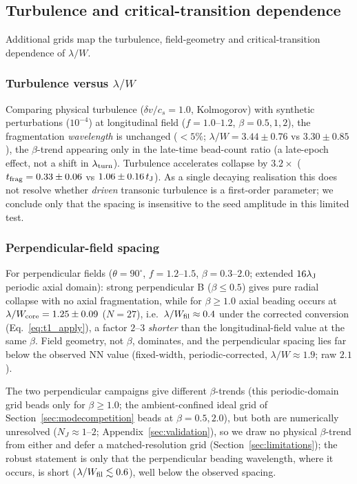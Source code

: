 \documentclass[usenatbib,twoside,twocolumn]{mnras}
\begin{document}
\subsection{Turbulence and critical-transition dependence}
\label{sec:supplementary_campaigns}

Additional grids map the turbulence, field-geometry and critical-transition dependence of $\lambda/W$.

\subsubsection{Turbulence versus $\lambda/W$}

Comparing physical turbulence ($\delta v/c_s=1.0$, Kolmogorov) with synthetic perturbations ($10^{-4}$) at longitudinal field ($f=1.0$--$1.2$, $\beta=0.5,1,2$), the fragmentation \textit{wavelength} is unchanged ($<5\%$; $\lambda/W=3.44\pm0.76$ vs $3.30\pm0.85$), the $\beta$-trend appearing only in the late-time bead-count ratio (a late-epoch effect, not a shift in $\lambda_{\rm turn}$). Turbulence accelerates collapse by $3.2\times$ ($t_{\rm frag}=0.33\pm0.06$ vs $1.06\pm0.16\,t_{\rm J}$). As a single decaying realisation this does not resolve whether \emph{driven} transonic turbulence is a first-order parameter; we conclude only that the spacing is insensitive to the seed amplitude in this limited test.

\subsubsection{Perpendicular-field spacing}

For perpendicular fields ($\theta=90^\circ$, $f=1.2$--$1.5$, $\beta=0.3$--$2.0$; extended $16\lambda_{\rm J}$ periodic axial domain): strong perpendicular B ($\beta\leq0.5$) gives pure radial collapse with no axial fragmentation, while for $\beta\geq1.0$ axial beading occurs at $\lambda/W_{\rm core}=1.25\pm0.09$ ($N=27$), i.e.\ $\lambda/W_{\rm fil}\approx0.4$ under the corrected conversion (Eq.~\ref{eq:t1_apply}), a factor $2$--$3$ \textit{shorter} than the longitudinal-field value at the same $\beta$. Field geometry, not $\beta$, dominates, and the perpendicular spacing lies far below the observed NN value (fixed-width, periodic-corrected, $\lambda/W\approx1.9$; raw $2.1$).

The two perpendicular campaigns give different $\beta$-trends (this periodic-domain grid beads only for $\beta\geq1.0$; the ambient-confined ideal grid of Section~\ref{sec:modecompetition} beads at $\beta=0.5,2.0$), but both are numerically unresolved ($N_J\approx1$--$2$; Appendix~\ref{sec:validation}), so we draw no physical $\beta$-trend from either and defer a matched-resolution grid (Section~\ref{sec:limitations}); the robust statement is only that the perpendicular beading wavelength, where it occurs, is short ($\lambda/W_{\rm fil}\lesssim0.6$), well below the observed spacing.
\end{document}
